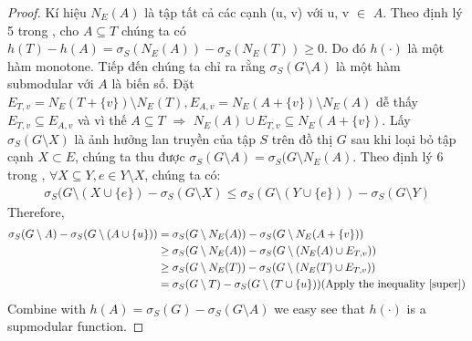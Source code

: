 \begingroup
\fontsize{13pt}{12pt}
\selectfont		 
\begin{proof}	
	Kí hiệu $N_E(A)$ là tập tất cả các cạnh (u, v) với u, v $\in$ $A$. Theo định lý 5 trong \cite{khali}, cho $A \subseteq T$ chúng ta có $h(T)-h(A)=\sigma_{S}(N_E(A))- \sigma_{S}(N_E(T)) \geq 0$. Do đó $h(\cdot)$ là một hàm monotone. 
	Tiếp đến chúng ta chỉ ra rằng $\sigma_S(G \setminus A)$ là một hàm submodular với $A$ là biến số. Đặt $E_{T, v}=N_E(T+\{v\})\setminus N_E(T), E_{A, v}= N_E(A+\{v\}) \setminus N_E(A)$ dễ thấy $E_{T, v} \subseteq E_{A, v}$  và vì thế $A \subseteq T$ $\Rightarrow$ $N_E(A)\cup E_{T, v} \subseteq N_E(A+ \{v\})$. Lấy $\sigma_S(G \setminus X)$ là ảnh hưởng lan truyền của tập $S$ trên đồ thị $G$ sau khi loại bỏ tập cạnh $X \subset E$, chúng ta thu được $\sigma_{S}(G \setminus A)=\sigma_{S}(G \setminus N_E(A)$. Theo định lý 6 trong \cite{khali}, $\forall X \subseteq Y, e \in Y\setminus X$, chúng ta có: 
	\begin{align}
	\sigma_{S}(G \setminus (X \cup \{e\}) - \sigma_{S}(G \setminus X) 
	\leq \sigma_{S}(G \setminus (Y \cup \{e\})) - \sigma_{S}(G \setminus Y)
	\label{super}
	\end{align}
	Therefore,
	\begin{align}
	\sigma_{S}(G \setminus A)-\sigma_{S}(G \setminus (A \cup \{u\})) 
	& =\sigma_{S}(G \setminus N_E(A))-\sigma_{S}(G \setminus N_E(A+\{v\})) 
	\\
	&	\geq \sigma_{S}(G \setminus N_E(A))-\sigma_{S}(G \setminus (N_E(A) \cup E_{T, v})) 
	\\
	&	\geq \sigma_{S}(G \setminus N_E(T))-\sigma_{S}(G \setminus (N_E(T) \cup E_{T, v}))  
	\\
	& = \sigma_{S}(G\setminus T)-\sigma_{S}(G \setminus (T \cup \{u\}))  ( \mbox{Apply the inequality  \eqref{super}})
	\end{align}
	Combine with $h(A)= \sigma_S(G)- \sigma_S(G\setminus A)$ we easy see that $h(\cdot)$ is a supmodular function.
\end{proof}
\endgroup

